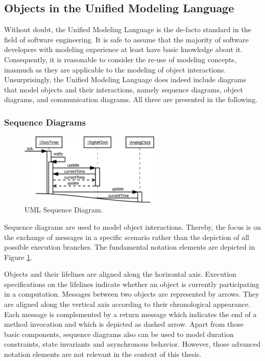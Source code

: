 \subsection{Objects in the Unified Modeling Language}
\label{ss:BackgroundModelingUML}
Without doubt, the Unified Modeling Language is the de-facto standard in the field of software engineering.
It is safe to assume that the majority of software developers with modeling experience at least have basic knowledge about it.
Consequently, it is reasonable to consider the re-use of modeling concepts, inasmuch as they are applicable to the modeling of object interactions.
Unsurprisingly, the Unified Modeling Language does indeed include diagrams that model objects and their interactions, namely sequence diagrams, object diagrams, and communication diagrams.
All three are presented in the following.

\subsubsection{Sequence Diagrams}

\begin{figure}
	\centering
	\includegraphics[width=0.6\textwidth]{../images/02-Sequence}
	\caption{UML Sequence Diagram.}
	\label{fig:BackgroundModelingSequence}
\end{figure}

Sequence diagrams \cite{rumbaugh_unified_2010} are used to model object interactions.
Thereby, the focus is on the exchange of messages in a specific scenario rather than the depiction of all possible execution branches.
The fundamental notation elements are depicted in Figure \ref{fig:BackgroundModelingSequence}.

Objects and their lifelines are aligned along the horizontal axis.
Execution specifications on the lifelines indicate whether an object is currently participating in a computation.
Messages between two objects are represented by arrows.
They are aligned along the vertical axis according to their chronological appearance.
Each message is complemented by a return message which indicates the end of a method invocation and which is depicted as dashed arrow.
Apart from those basic components, sequence diagrams also can be used to model duration constraints, state invariants and asynchronous behavior.
However, those advanced notation elements are not relevant in the context of this thesis.

